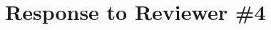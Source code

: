 \documentclass[preprint]{elsarticle}
\begin{document}
\section{Response to Reviewer \#4}

\begin{quote}\textbf{
}\end{quote}



\end{document}
